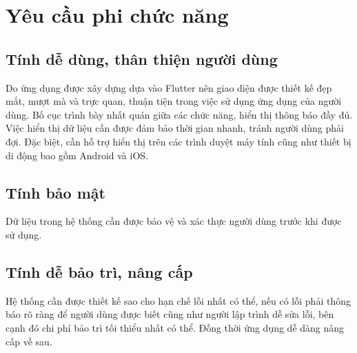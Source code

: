 \documentclass[../DoAn.tex]{subfiles}
\begin{document}
\section{Yêu cầu phi chức năng}
\label{section:2.4}

\subsection{Tính dễ dùng, thân thiện người dùng}
\label{section:2.4.1}
Do ứng dụng được xây dựng dựa vào Flutter nên giao diện được thiết kế đẹp mắt, mượt mà và trực quan, thuận tiện trong việc sử dụng ứng dụng của người dùng. Bố cục trình bày nhất quán giữa các chức năng, hiển thị thông báo đầy đủ. Việc hiển thị dữ liệu cần được đảm bảo thời gian nhanh, tránh người dùng phải đợi. Đặc biệt, cần hỗ trợ hiển thị trên các trình duyệt máy tính cũng như thiết bị di động bao gồm Android và iOS.
\subsection{Tính bảo mật}
\label{section:2.4.2}
Dữ liệu trong hệ thống cần được bảo vệ và xác thực người dùng trước khi được sử dụng.
\subsection{Tính dễ bảo trì, nâng cấp}
\label{section:2.4.4}
Hệ thống cần được thiết kế sao cho hạn chế lỗi nhất có thể, nếu có lỗi phải thông báo rõ ràng để người dùng được biết cũng như người lập trình dễ sửa lỗi, bên cạnh đó chi phí bảo trì tối thiểu nhất có thể. Đồng thời ứng dụng dễ dàng nâng cấp về sau.


\end{document}
